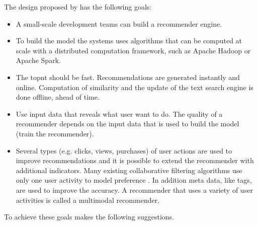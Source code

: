 The design proposed by \cite{Dunning14} has the following goals:
\begin{itemize}
\item A small-scale development teams can build a recommender engine.
\item To build the model the systems uses algorithms that can be computed at scale with a distributed computation framework, such as Apache Hadoop or Apache Spark. 
\item The \gls{topnt} should be fast. Recommendations are generated instantly and online. Computation of similarity and the update of the text search engine is done offline, ahead of time.
\item Use input data that reveals what user want to do. The quality of a recommender depends on the input data that is used to build the model (train the recommender). 
\item Several types (e.g. clicks, views, purchases) of user actions are used to improve recommendations and it is possible to extend the recommender with additional \glspl{indicator}. Many existing collaborative filtering algorithms use only one user activity to model preference \cite{ferrel}. In addition meta data, like \glspl{tag}, are used to improve the accuracy. A recommender that uses a variety of user activities is called a \gls{multimodal} recommender. 
\end{itemize}

To achieve these goals \cite{Dunning14} makes the following suggestions.

